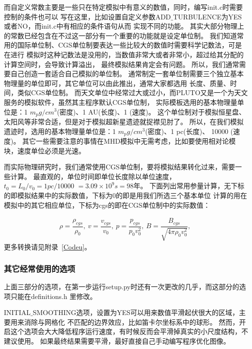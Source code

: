 而自定义常数主要是一些只在特定模拟中有意义的数值，同时，编写init.c时需要控制的条件也可以
写在这里，比如设置自定义参数ADD$\_$TURBULENCE为YES或者NO，而init.c中有相应的条件语句从而
实现不同的功能。
其实大部分物理上的常数已经包含在不过这一部分有一个重要的功能就是设定单位制。
我们知道常用的国际单位制、CGS单位制要表达一些比较大的数值时需要科学记数法，可是在进行
模拟时这种记数法是没用的，当数值非常大或者非常小，超过给其分配的计算空间时，会导致计算溢出，
最终模拟结果肯定会有问题。
所以，我们通常需要自己创造一套适合自己模拟的单位制。
通常制定一套单位制需要三个独立基本物理量的单位即可，其它单位可以由此推出，通常大家都选用
长度、质量、时间，类似CGS单位制。
而天文单位中经常过大或过小，而PLUTO又是一个为天文服务的模拟软件，虽然其主程序默认CGS单位制，
实际模板选用的基本物理量单位是：1 $m_p g/cm^3$(密度)、1 AU(长度)、1 \kms(速度)。
这个单位制对于模拟恒星盘、太阳风等非常合适，但是对于模拟超新星遗迹就捉襟见肘了。
所以，在我们模拟遗迹时，选用的基本物理量单位是：1 $m_p g/cm^3$(密度)、1 pc(长度)、
10000 \kms(速度)。
其它一些需要注意的事情在MHD模拟中无需考虑，比如要使用相对论模块，速度单位必须是光速。

而实际物理研究时，我们通常使用CGS单位制，要将模拟结果转化过来，需要一些计算。
最直观的，单位时间即单位长度除以单位速度，
$t_0 = L_0/v_0 = 1 pc/10000$ \kms $= 3.09\times10^9 s = 98$年。
下面列出常用参量计算，无下标的即模拟结果中的实际数值，下标为0的即是用我们所选三个基本单位
计算的用在模拟中的其它相应单位，下标为cgs的即在CGS单位制中的实际数值：

\begin{equation}
  \begin{aligned}
    \rho = \dfrac{\rho_{cgs}}{\rho_0} ,   \
    v = \dfrac{v_{cgs}}{v_0} ,   \
    p= \dfrac{p_{cgs}}{p_0v_0^2} ,   \
    B = \dfrac{B_{cgs}}{\sqrt{4\pi\rho_0v_0^2}} ,   \
  \end{aligned}
\end{equation}
更多转换请见附录~\ref{Codeu}。

\subsubsection{其它经常使用的选项}
上面三部分的选项，在第一步运行setup.py时还有一次更改的几乎，而这部分的选项只能在definitions.h
里修改。

INITIAL$\_$SMOOTHING选项，设置为YES可以用来数值平滑起伏很大的区域，主要用来消除与网格化
不匹配的边界效应，比如笛卡尔坐标系中的球形。
然而，开启这个选项会大大降低程序运行速度，有时候反而会平滑掉真实的小尺度结构，不建议使用。
如果最终结果需要平滑，最好直接自己手动编写程序优化图像。

